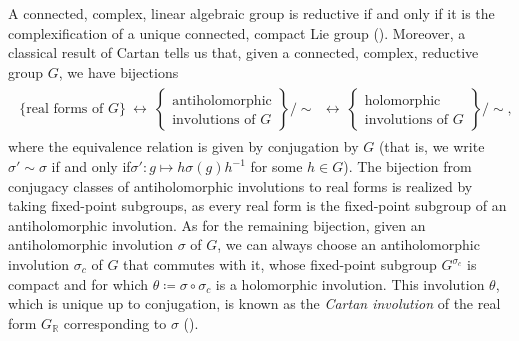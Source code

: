 \noindent\begin{remark} A connected, complex, linear algebraic group is reductive if and only if it is the complexification of a unique connected, compact Lie group (\cite[p.\ 34]{Kam11}). Moreover, a classical result of Cartan tells us that, given a connected, complex, reductive group $G$, we have bijections
\begin{align*}
\begin{split}
\{\text{real forms of $G$}\}\ \longleftrightarrow\ \left\{\begin{matrix}\text{antiholomorphic}\\\text{involutions of $G$}\end{matrix}\right\}\!\big/\!\!\sim\ \ \longleftrightarrow\ \left\{\begin{matrix}\text{holomorphic}\\\text{involutions of $G$}\end{matrix}\right\}\!\big/\!\!\sim,
\end{split}
\end{align*}
\noindent where the equivalence relation is given by conjugation by $G$ (that is, we write $\sigma' \sim \sigma$ if and only if\linebreak $\sigma' : g \mapsto h\sigma(g)h^{-1}$ for some $h \in G$). The bijection from conjugacy classes of antiholomorphic involutions to real forms is realized by taking fixed-point subgroups, as every real form is the fixed-point subgroup of an antiholomorphic involution. As for the remaining bijection, given an antiholomorphic involution $\sigma$ of $G$, we can always choose an antiholomorphic involution $\sigma_c$ of $G$ that commutes with it, whose fixed-point subgroup $G^{\sigma_c}$ is compact and for which $\theta \coloneqq \sigma \circ \sigma_c$ is a holomorphic involution. This involution $\theta$, which is unique up to conjugation, is known as the {\em Cartan involution} of the real form $G_\mathbb{R}$ corresponding to $\sigma$ (\cite{Ada14}).\\
\end{remark}

